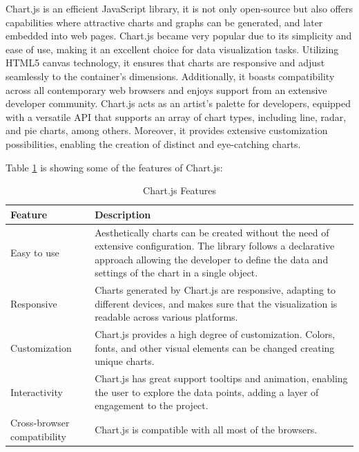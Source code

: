 Chart.js is an efficient JavaScript library, it is not only open-source but also offers capabilities where attractive charts and graphs can be generated, and later
embedded into web pages. Chart.js became very popular due to its simplicity and ease of use, making it an excellent choice for data visualization tasks. Utilizing HTML5 
canvas technology, it ensures that charts are responsive and adjust seamlessly to the container's dimensions. Additionally, it boasts compatibility across 
all contemporary web browsers and enjoys support from an extensive developer community. Chart.js acts as an artist's palette for developers, equipped with 
a versatile API that supports an array of chart types, including line, radar, and pie charts, among others. Moreover, it provides extensive customization 
possibilities, enabling the creation of distinct and eye-catching charts.\cite{da2019learn}

Table \ref*{tab:chart-js-features} is showing some of the features of Chart.js\cite{da2019learn}:

\begin{table}[H]
    \centering

    \begin{tabularx}{\textwidth}{|l|X|}
        \hline
        \textbf{Feature}            & \textbf{Description}                                                                                                                                                                                                \\
        \hline
        Easy to use                 & Aesthetically charts can be created without the need of extensive configuration. The library follows a declarative approach allowing the developer to define the data and settings of the chart in a single object. \\
        \hline
        Responsive                  & Charts generated by Chart.js are responsive, adapting to different devices, and makes sure that the visualization is readable across various platforms.                              \\
        \hline
        Customization               & Chart.js provides a high degree of customization. Colors, fonts, and other visual elements can be changed creating unique charts.                                                      \\
        \hline
        Interactivity               & Chart.js has great support tooltips and animation, enabling the user to explore the data points, adding a layer of engagement to the project.                                                               \\
        \hline
        Cross-browser compatibility & Chart.js is compatible with all most of the browsers.                                                                                                 \\
        \hline
    \end{tabularx}
    \caption{Chart.js Features}
    \label{tab:chart-js-features}
\end{table}

